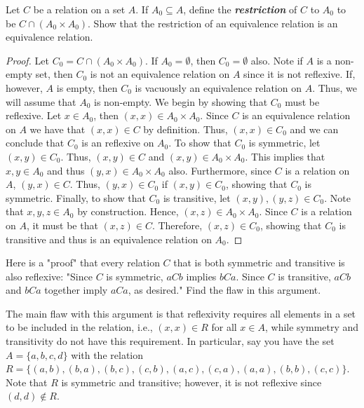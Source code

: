 \documentclass[12pt]{article}
\begin{document}
 Let $C$ be a relation on a set $A$. If $A_0 \subseteq A$, define the 
\textbf{\textit{restriction}} of $C$ to $A_0$ to be $C \cap (A_0 \times A_0)$.
Show that the restriction of an equivalence relation is an equivalence relation.

\begin{proof}
	Let $C_0 = C \cap (A_0 \times A_0)$. If $A_0 = \emptyset$, then $C_0 = \emptyset$ also.
	Note if $A$ is a non-empty set, then $C_0$ is not an equivalence relation on $A$ since it 
	is not reflexive. If, however, $A$ is empty, then $C_0$ is vacuously an equivalence relation on
	$A$. Thus, we will assume that $A_0$ is non-empty. We begin by showing that $C_0$ must be reflexive.
	Let $x \in A_0$, then $(x, x) \in A_0 \times A_0$. Since $C$ is an equivalence relation on $A$
	we have that $(x, x) \in C$ by definition. Thus, $(x, x) \in C_0$ and we can conclude that 
	$C_0$ is an reflexive on $A_0$. To show that $C_0$ is symmetric, let $(x, y) \in C_0$. 
	Thus, $(x, y) \in C$ and $(x, y) \in A_0 \times A_0$. This implies that $x, y \in A_0$ and thus
	$(y, x) \in A_0 \times A_0$ also. Furthermore, since $C$ is a relation on $A$, $(y, x) \in C$.
	Thus, $(y, x) \in C_0$ if $(x, y) \in C_0$, showing that $C_0$ is symmetric. Finally, to show that
	$C_0$ is transitive, let $(x,y), (y, z) \in C_0$. Note that $x, y, z \in A_0$ 
	by construction. Hence, $(x, z) \in A_0 \times A_0$. Since $C$ is a relation on $A$, it must 
	be that $(x, z) \in C$. Therefore, $(x, z) \in C_0$, showing that $C_0$ is transitive and thus 
	is an equivalence relation on $A_0$.
\end{proof}

 Here is a "proof" that every relation $C$ that is both symmetric and 
transitive is also reflexive: "Since $C$ is symmetric, $aCb$ implies $bCa$. Since 
$C$ is transitive, $aCb$ and $bCa$ together imply $aCa$, as desired." Find the flaw in
this argument.

The main flaw with this argument is that reflexivity requires all elements in a set to be included in the 
relation, i.e., $(x, x) \in R$ for all $x \in A$, while symmetry and transitivity do not have this 
requirement. In particular, say you have the set $A = \{a, b, c, d\}$
with the relation $R = \{(a, b), \allowbreak (b, a), \allowbreak (b, c), \allowbreak (c, b), \allowbreak (a, c), 
\allowbreak (c, a), \allowbreak (a, a), \allowbreak (b, b), \allowbreak (c, c)\}$.
Note that $R$ is symmetric and transitive; however, it is not reflexive since $(d, d) \notin R$.
\end{document}

